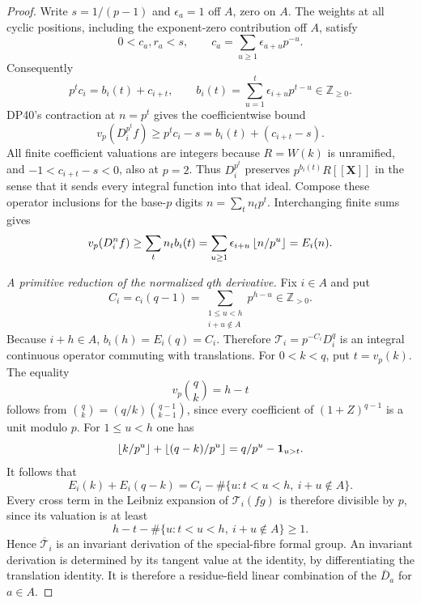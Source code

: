 \documentclass[11pt,a4paper]{article}
\theoremstyle{definition}\newtheorem{remark}[theorem]{Remark}
\newcommand{\Z}{\mathbb Z}\newcommand{\Q}{\mathbb Q}\newcommand{\F}{\mathbb F}
\newcommand{\mathscr}[1]{\mathcal{#1}}
\newcommand{\vp}{v_p}\newcommand{\dR}{\mathrm{dR}}\newcommand{\crys}{\mathrm{crys}}
\begin{document}
\begin{proof}
Write $s=1/(p-1)$ and $\epsilon_a=1$ off $A$, zero on $A$. The weights at all cyclic positions, including the exponent-zero contribution off $A$, satisfy
\[
 0<c_a,r_a<s,\qquad
 c_a=\sum_{u\ge1}\epsilon_{a+u}p^{-u}.
\]
Consequently
\[
 p^tc_i=b_i(t)+c_{i+t},\qquad
 b_i(t)=\sum_{u=1}^t\epsilon_{i+u}p^{t-u}\in\Z_{\ge0}.
\]
DP40's contraction at $n=p^t$ gives the coefficientwise bound
\[
 \vp(D_i^{p^t}f)\ge p^tc_i-s=b_i(t)+(c_{i+t}-s).
\]
All finite coefficient valuations are integers because $R=W(k)$ is unramified, and $-1<c_{i+t}-s<0$, also at $p=2$.
Thus $D_i^{p^t}$ preserves $p^{b_i(t)}R[[\mathbf X]]$ in the sense that it sends every integral function into that ideal. Compose these operator inclusions for the base-$p$ digits $n=\sum_tn_tp^t$. Interchanging finite sums gives
\[
 \vp(D_i^nf)\ge\sum_tn_tb_i(t)
       =\sum_{u\ge1}\epsilon_{i+u}\floor{n/p^u}=E_i(n).
\]

\emph{A primitive reduction of the normalized $q$th derivative.}
Fix $i\in A$ and put
\[
 C_i=c_i(q-1)=
       \sum_{\substack{1\le u<h\\i+u\notin A}}p^{h-u}\in\Z_{>0}.
\]
Because $i+h\in A$, $b_i(h)=E_i(q)=C_i$. Therefore
$\mathscr T_i=p^{-C_i}D_i^q$ is an integral continuous operator commuting with translations.
For $0<k<q$, put $t=\vp(k)$.
The equality
\[
 \vp\binom qk=h-t
\]
follows from $\binom qk=(q/k)\binom{q-1}{k-1}$, since every coefficient of
$(1+Z)^{q-1}$ is a unit modulo $p$.
For $1\le u<h$ one has
\[
 \left\lfloor k/p^u\right\rfloor+\left\lfloor (q-k)/p^u\right\rfloor
       =q/p^u-\mathbf1_{u>t}.
\]
It follows that
\[
 E_i(k)+E_i(q-k)
       =C_i-\#\{u:t<u<h,\ i+u\notin A\}.
\]
Every cross term in the Leibniz expansion of $\mathscr T_i(fg)$ is therefore divisible by $p$, since its valuation is at least
\[
 h-t-\#\{u:t<u<h,\ i+u\notin A\}\ge1.
\]
Hence $\overline{\mathscr T}_i$ is an invariant derivation of the special-fibre formal group. An invariant derivation is determined by its tangent value at the identity, by differentiating the translation identity. It is therefore a residue-field linear combination of the $\bar D_a$ for $a\in A$.


\end{proof}
\end{document}
